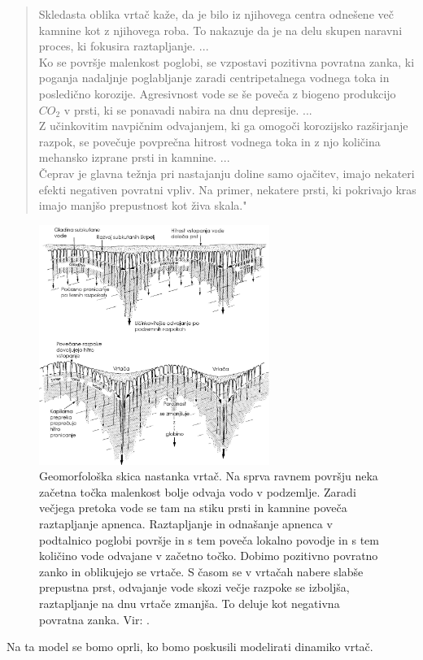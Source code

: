 \documentclass[a4paper, twoside, 12pt]{book}
\begin{document}
\begin{quotation}
Skledasta oblika vrtač kaže, da je bilo iz njihovega centra odnešene več kamnine kot z njihovega roba. To nakazuje da je na delu skupen naravni proces, ki fokusira raztapljanje. ... \\
Ko se površje malenkost poglobi, se vzpostavi pozitivna povratna zanka, ki poganja nadaljnje poglabljanje zaradi centripetalnega vodnega toka in posledično korozije. Agresivnost vode se še poveča z biogeno produkcijo $CO_2$ v prsti, ki se ponavadi nabira na dnu depresije. ... \\
Z učinkovitim navpičnim odvajanjem, ki ga omogoči korozijsko razširjanje razpok, se povečuje povprečna hitrost vodnega toka in z njo količina mehansko izprane prsti in kamnine. ... \\
Čeprav je glavna težnja pri nastajanju doline samo ojačitev, imajo nekateri efekti negativen povratni vpliv. Na primer, nekatere prsti, ki pokrivajo kras imajo manjšo prepustnost kot živa skala."
\end{quotation}
\begin{figure}[h!]
  \begin{center}
    \includegraphics[width=7.5cm]{slike/vrtaca-ford-williams.jpg}
  \end{center}
  \caption{Geomorfološka skica nastanka vrtač. Na sprva ravnem površju neka začetna točka malenkost bolje odvaja vodo v podzemlje. Zaradi večjega pretoka vode se tam na stiku prsti in kamnine poveča raztapljanje apnenca. Raztapljanje in odnašanje apnenca v podtalnico poglobi površje in s tem poveča lokalno povodje in s tem količino vode odvajane v začetno točko. Dobimo pozitivno povratno zanko in oblikujejo se vrtače. S časom se v vrtačah nabere slabše prepustna prst, odvajanje vode skozi večje razpoke se izboljša, raztapljanje na dnu vrtače zmanjša. To deluje kot negativna povratna zanka. Vir: \cite{ford2007karst}.}
\label{fig:vrtaca-ford-williams}
\end{figure}
Na ta model se bomo oprli, ko bomo poskusili modelirati dinamiko vrtač.
\end{document}
